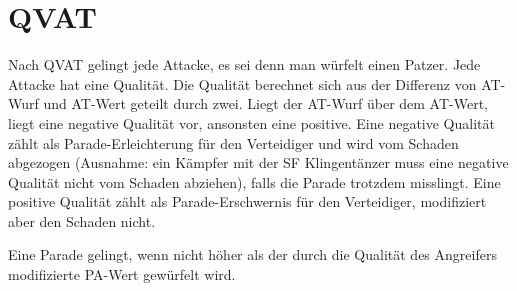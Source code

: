 %

\section{QVAT}
Nach QVAT gelingt jede Attacke, es sei denn man würfelt einen Patzer.
Jede Attacke hat eine Qualität.
Die Qualität berechnet sich aus der Differenz von AT-Wurf und AT-Wert geteilt durch zwei.
Liegt der AT-Wurf über dem AT-Wert, liegt eine negative Qualität vor, ansonsten eine positive.
Eine negative Qualität zählt als Parade-Erleichterung für den Verteidiger und wird vom Schaden abgezogen (Ausnahme: ein Kämpfer mit der SF Klingentänzer muss eine negative Qualität nicht vom Schaden abziehen), falls die Parade trotzdem misslingt.
Eine positive Qualität zählt als Parade-Erschwernis für den Verteidiger, modifiziert aber den Schaden nicht.

Eine Parade gelingt, wenn nicht höher als der durch die Qualität des Angreifers modifizierte PA-Wert gewürfelt wird.
